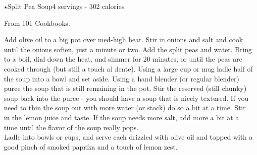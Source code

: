 \begin{recipe}{\texorpdfstring{$\star$}{str}Split Pea Soup}{4 servings - 302 calories}{}

\freeform From 101 Cookbooks.


Add olive oil to a big pot over med-high heat. Stir in onions and salt and cook until the onions soften, just a minute or two. Add the split peas and water. Bring to a boil, dial down the heat, and simmer for 20 minutes, or until the peas are cooked through (but still a touch al dente). Using a large cup or mug ladle half of the soup into a bowl and set aside. Using a hand blender (or regular blender) puree the soup that is still remaining in the pot. Stir the reserved (still chunky) soup back into the puree - you should have a soup that is nicely textured. If you need to thin the soup out with more water (or stock) do so a bit at a time. Stir in the lemon juice and taste. If the soup needs more salt, add more a bit at a time until the flavor of the soup really pops.\\

Ladle into bowls or cups, and serve each drizzled with olive oil and topped with a good pinch of smoked paprika and a touch of lemon zest.
\end{recipe}